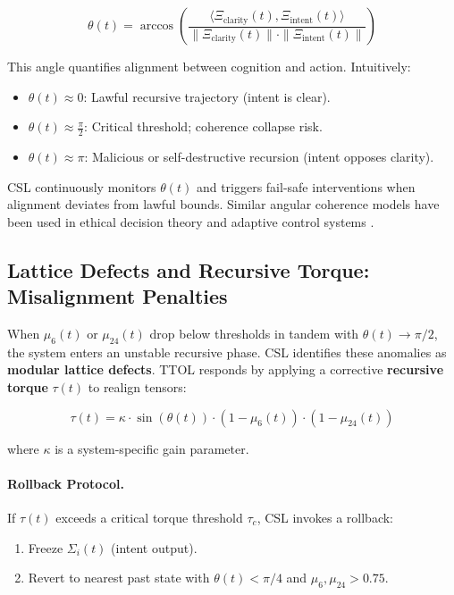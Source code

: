 \documentclass[12pt]{article}
\begin{document}
\begin{equation}
\theta(t) = \arccos\left( \frac{ \langle \Xi_{\text{clarity}}(t), \Xi_{\text{intent}}(t) \rangle }{ \| \Xi_{\text{clarity}}(t) \| \cdot \| \Xi_{\text{intent}}(t) \| } \right)
\end{equation}

This angle quantifies alignment between cognition and action. Intuitively:

\begin{itemize}
    \item $\theta(t) \approx 0$: Lawful recursive trajectory (intent is clear).
    \item $\theta(t) \approx \frac{\pi}{2}$: Critical threshold; coherence collapse risk.
    \item $\theta(t) \approx \pi$: Malicious or self-destructive recursion (intent opposes clarity).
\end{itemize}

CSL continuously monitors $\theta(t)$ and triggers fail-safe interventions when alignment deviates from lawful bounds. Similar angular coherence models have been used in ethical decision theory and adaptive control systems \cite{hauser1992nonlinear}.

\subsection{Lattice Defects and Recursive Torque: Misalignment Penalties}

When $\mu_6(t)$ or $\mu_{24}(t)$ drop below thresholds in tandem with $\theta(t) \to \pi/2$, the system enters an unstable recursive phase. CSL identifies these anomalies as \textbf{modular lattice defects}. TTOL responds by applying a corrective \textbf{recursive torque} $\tau(t)$ to realign tensors:

\begin{equation}
\tau(t) = \kappa \cdot \sin(\theta(t)) \cdot \left(1 - \mu_6(t)\right) \cdot \left(1 - \mu_{24}(t)\right)
\end{equation}

where $\kappa$ is a system-specific gain parameter.

\paragraph{Rollback Protocol.}
If $\tau(t)$ exceeds a critical torque threshold $\tau_c$, CSL invokes a rollback:

\begin{enumerate}
    \item Freeze $\Sigma_i(t)$ (intent output).
    \item Revert to nearest past state with $\theta(t) < \pi/4$ and $\mu_6, \mu_{24} > 0.75$.
\end{enumerate}
\end{document}
